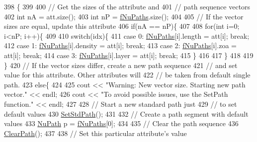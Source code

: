 \begin{DoxyCode}
398                                                     \{
399 
400   \textcolor{comment}{// Get the sizes of the attribute and}
401   \textcolor{comment}{// path sequence vectors}
402   \textcolor{keywordtype}{int} nA = att.size();
403   \textcolor{keywordtype}{int} nP = \hyperlink{classOscProb_1_1PMNS__Base_a69db9d57e12fc7cbe0431bc6c18fac93}{fNuPaths}.size();
404 
405   \textcolor{comment}{// If the vector sizes are equal, update this attribute}
406   \textcolor{keywordflow}{if}(nA == nP)\{
407 
408     \textcolor{keywordflow}{for}(\textcolor{keywordtype}{int} i=0; i<nP; i++)\{
409 
410       \textcolor{keywordflow}{switch}(idx)\{
411         \textcolor{keywordflow}{case} 0: \hyperlink{classOscProb_1_1PMNS__Base_a69db9d57e12fc7cbe0431bc6c18fac93}{fNuPaths}[i].length  = att[i]; \textcolor{keywordflow}{break};
412         \textcolor{keywordflow}{case} 1: \hyperlink{classOscProb_1_1PMNS__Base_a69db9d57e12fc7cbe0431bc6c18fac93}{fNuPaths}[i].density = att[i]; \textcolor{keywordflow}{break};
413         \textcolor{keywordflow}{case} 2: \hyperlink{classOscProb_1_1PMNS__Base_a69db9d57e12fc7cbe0431bc6c18fac93}{fNuPaths}[i].zoa     = att[i]; \textcolor{keywordflow}{break};
414         \textcolor{keywordflow}{case} 3: \hyperlink{classOscProb_1_1PMNS__Base_a69db9d57e12fc7cbe0431bc6c18fac93}{fNuPaths}[i].layer   = att[i]; \textcolor{keywordflow}{break};
415       \}
416 
417     \}
418 
419   \}
420   \textcolor{comment}{// If the vector sizes differ, create a new path sequence}
421   \textcolor{comment}{// and set value for this attribute. Other attributes will}
422   \textcolor{comment}{// be taken from default single path.}
423   \textcolor{keywordflow}{else}\{
424 
425     cout << \textcolor{stringliteral}{"Warning: New vector size. Starting new path vector."} << endl;
426     cout << \textcolor{stringliteral}{"To avoid possible issues, use the SetPath function."} << endl;
427 
428     \textcolor{comment}{// Start a new standard path just}
429     \textcolor{comment}{// to set default values}
430     \hyperlink{classOscProb_1_1PMNS__Base_add6533a9fc9acdfc7ae258b62570d78d}{SetStdPath}();
431 
432     \textcolor{comment}{// Create a path segment with default values}
433     \hyperlink{structOscProb_1_1NuPath}{NuPath} p = \hyperlink{classOscProb_1_1PMNS__Base_a69db9d57e12fc7cbe0431bc6c18fac93}{fNuPaths}[0];
434 
435     \textcolor{comment}{// Clear the path sequence}
436     \hyperlink{classOscProb_1_1PMNS__Base_aefe521239031c418cfaaaa550a6e13bb}{ClearPath}();
437 
438     \textcolor{comment}{// Set this particular attribute's value}

\end{DoxyCode}
